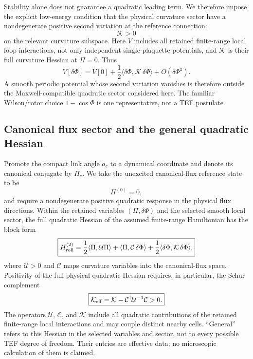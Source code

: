 \documentclass[11pt]{article}
\begin{document}
Stability alone does not guarantee a quadratic leading term. We therefore impose the explicit low-energy condition that the physical curvature sector have a nondegenerate positive second variation at the reference connection:
\begin{equation}
\boxed{
\mathcal K>0
}
\end{equation}
on the relevant curvature subspace. Here $V$ includes all retained finite-range local loop interactions, not only independent single-plaquette potentials, and $\mathcal K$ is their full curvature Hessian at $\Pi=0$. Thus
\begin{equation}
V[\delta\Phi]
=
V[0]
+
\frac12\langle\delta\Phi,\mathcal K\,\delta\Phi\rangle
+
O(\delta\Phi^3).
\end{equation}
A smooth periodic potential whose second variation vanishes is therefore outside the Maxwell-compatible quadratic sector considered here. The familiar Wilson/rotor choice $1-\cos\Phi$ is one representative, not a TEF postulate.

\subsection{Canonical flux sector and the general quadratic Hessian}

Promote the compact link angle $a_e$ to a dynamical coordinate and denote its canonical conjugate by $\Pi_e$. We take the unexcited canonical-flux reference state to be
\begin{equation}
\Pi^{(0)}=0,
\end{equation}
and require a nondegenerate positive quadratic response in the physical flux directions. Within the retained variables $(\Pi,\delta\Phi)$ and the selected smooth local sector, the full quadratic Hessian of the assumed finite-range Hamiltonian has the block form
\begin{equation}
\boxed{
H_{\rm roll}^{(2)}
=
\frac12\langle\Pi,\mathcal U\Pi\rangle
+
\langle\Pi,\mathcal C\,\delta\Phi\rangle
+
\frac12\langle\delta\Phi,\mathcal K\,\delta\Phi\rangle,
}
\end{equation}
where $\mathcal U>0$ and $\mathcal C$ maps curvature variables into the canonical-flux space. Positivity of the full physical quadratic Hessian requires, in particular, the Schur complement
\begin{equation}
\boxed{
\mathcal K_{\rm eff}
=
\mathcal K
-
\mathcal C^\dagger\mathcal U^{-1}\mathcal C
>0.
}
\end{equation}
The operators $\mathcal U$, $\mathcal C$, and $\mathcal K$ include all quadratic contributions of the retained finite-range local interactions and may couple distinct nearby cells. ``General'' refers to this Hessian in the selected variables and sector, not to every possible TEF degree of freedom. Their entries are effective data; no microscopic calculation of them is claimed.
\end{document}
